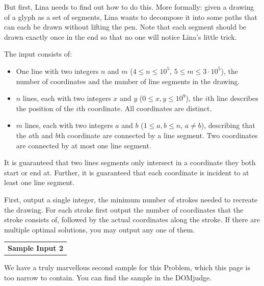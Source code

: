 But first, Lina needs to find out how to do this.
More formally: given a drawing of a glyph as a set of segments, Lina wants to decompose it into some paths that can each be drawn without lifting the pen.
Note that each segment should be drawn exactly once in the end so that no one will notice Lina's little trick.

\begin{Input}
	The input consists of:
	\begin{itemize}
		\item One line with two integers $n$ and $m$ ($4\leq n \leq10^5$, $5\leq m\leq3\cdot10^5$), the number of coordinates and the number of line segments in the drawing.
		\item $n$ lines, each with two integers $x$ and $y$ ($0\leq x,y\leq10^9$), the $i$th line describes the position of the $i$th coordinate.
		All coordinates are distinct.
		\item $m$ lines, each with two integers $a$ and $b$ ($1\leq a,b\leq n$, $a\neq b$), describing that the $a$th and $b$th coordinate are connected by a line segment.
		Two coordinates are connected by at most one line segment.
	\end{itemize}
	It is guaranteed that two lines segments only intersect in a coordinate they both start or end at.
	Further, it is guaranteed that each coordinate is incident to at least one line segment.
\end{Input}

\begin{Output}
	First, output a single integer, the minimum number of strokes needed to recreate the drawing.
	For each stroke first output the number of coordinates that the stroke consists of, followed by the actual coordinates along the stroke.
	If there are multiple optimal solutions, you may output any one of them.
\end{Output}

\nextsample{}

\par\vspace{0.5cm}
\begin{tabular}{l}
	\textbf{Sample Input 2}\\
\end{tabular}

We have a truly marvellous second sample for this Problem, which this page is too narrow to contain.
You can find the sample in the DOMjudge.

\newsavebox\removesample
\sbox\removesample{\remainingsamples{}}


